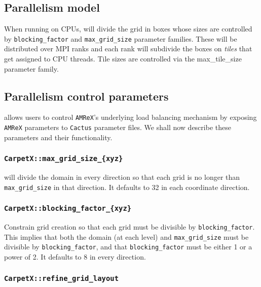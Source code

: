\subsection{Parallelism model}

When running on CPUs, \AMReX\space will divide the grid in boxes whose sizes are controlled by \texttt{blocking\_factor} and \texttt{max\_grid\_size} parameter families. These will be distributed over MPI ranks and each rank will subdivide the boxes on \textit{tiles} that get assigned to CPU threads. Tile sizes are controlled via the max\_tile\_size parameter family.


\subsection{Parallelism control parameters}

\CarpetX\space allows users to control \texttt{AMReX}'s underlying load balancing mechanism by exposing \texttt{AMReX} parameters to \texttt{Cactus} parameter files. We shall now describe these parameters and their functionality.

\subsubsection{\texttt{CarpetX::max\_grid\_size\_\{xyz\}}}

\AMReX\space will divide the domain in every direction so that each grid is no longer than \texttt{max\_grid\_size} in that direction. It defaults to 32 in each coordinate direction.

\subsubsection{\texttt{CarpetX::blocking\_factor\_\{xyz\}}}

Constrain grid creation so that each grid must be divisible by \texttt{blocking\_factor}. This implies that both the domain (at each level) and \texttt{max\_grid\_size} must be divisible by \texttt{blocking\_factor}, and that \texttt{blocking\_factor} must be either 1 or a power of 2. It defaults to 8 in every direction.

\subsubsection{\texttt{CarpetX::refine\_grid\_layout}}

